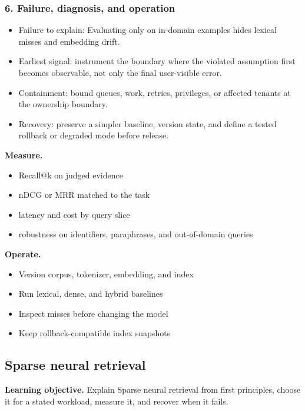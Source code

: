 \subsubsection*{6. Failure, diagnosis, and operation}
\begin{itemize}
\item Failure to explain: Evaluating only on in-domain examples hides lexical misses and embedding drift.
\item Earliest signal: instrument the boundary where the violated assumption first becomes observable, not only the final user-visible error.
\item Containment: bound queues, work, retries, privileges, or affected tenants at the ownership boundary.
\item Recovery: preserve a simpler baseline, version state, and define a tested rollback or degraded mode before release.
\end{itemize}
\textbf{Measure.}\begin{itemize}
\item Recall@k on judged evidence
\item nDCG or MRR matched to the task
\item latency and cost by query slice
\item robustness on identifiers, paraphrases, and out-of-domain queries
\end{itemize}
\textbf{Operate.}\begin{itemize}
\item Version corpus, tokenizer, embedding, and index
\item Run lexical, dense, and hybrid baselines
\item Inspect misses before changing the model
\item Keep rollback-compatible index snapshots
\end{itemize}
\subsection{Sparse neural retrieval}
\textbf{Learning objective.} Explain Sparse neural retrieval from first principles, choose it for a stated workload, measure it, and recover when it fails.
